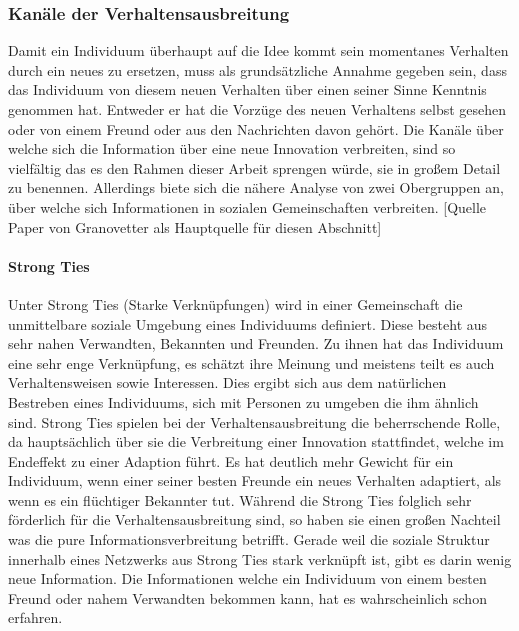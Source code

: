 \documentclass[12pt]{article}
\begin{document}
\subsubsection{Kanäle der Verhaltensausbreitung}
\label{intro_ties}
Damit ein Individuum überhaupt auf die Idee kommt sein momentanes Verhalten durch ein neues zu ersetzen, muss als grundsätzliche Annahme gegeben sein, dass das Individuum von diesem neuen Verhalten über einen seiner Sinne Kenntnis genommen hat. Entweder er hat die Vorzüge des neuen Verhaltens selbst gesehen oder von einem Freund oder aus den Nachrichten davon gehört. Die Kanäle über welche sich die Information über eine neue Innovation verbreiten, sind so vielfältig das es den Rahmen dieser Arbeit sprengen würde, sie in großem Detail zu benennen. Allerdings biete sich die nähere Analyse von zwei Obergruppen an, über welche sich Informationen in sozialen Gemeinschaften verbreiten.
[Quelle Paper von Granovetter als Hauptquelle für diesen Abschnitt]
\paragraph{Strong Ties}
Unter Strong Ties (Starke Verknüpfungen) wird in einer Gemeinschaft die unmittelbare soziale Umgebung eines Individuums definiert. Diese besteht aus sehr nahen Verwandten, Bekannten und Freunden. Zu ihnen hat das Individuum eine sehr enge Verknüpfung, es schätzt ihre Meinung und meistens teilt es auch Verhaltensweisen sowie Interessen. Dies ergibt sich aus dem natürlichen Bestreben eines Individuums, sich mit Personen zu umgeben die ihm ähnlich sind. Strong Ties spielen bei der Verhaltensausbreitung die beherrschende Rolle, da hauptsächlich über sie die Verbreitung einer Innovation stattfindet, welche im Endeffekt zu einer Adaption führt. Es hat deutlich mehr Gewicht für ein Individuum, wenn einer seiner besten Freunde ein neues Verhalten adaptiert, als wenn es ein flüchtiger Bekannter tut. Während die Strong Ties folglich sehr förderlich für die Verhaltensausbreitung sind, so haben sie einen großen Nachteil was die pure Informationsverbreitung betrifft. Gerade weil die soziale Struktur innerhalb eines Netzwerks aus Strong Ties stark verknüpft ist, gibt es darin wenig neue Information. Die Informationen welche ein Individuum von einem besten Freund oder nahem Verwandten bekommen kann, hat es wahrscheinlich schon erfahren.
\end{document}

